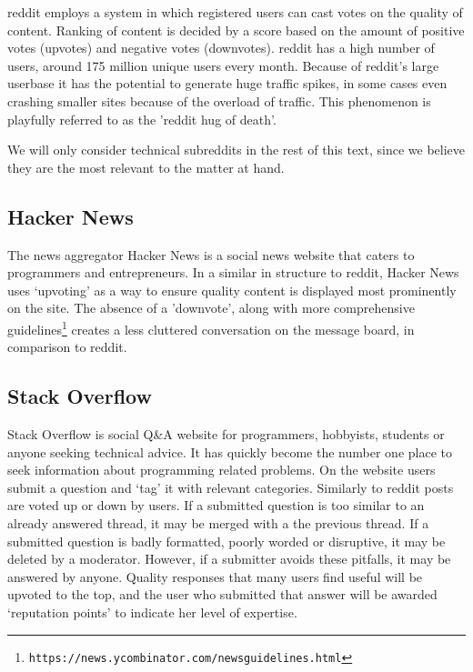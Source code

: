 \documentclass[a4paper,11pt]{article} %
\begin{document}
reddit employs a system in which registered users can cast votes on the
quality of content. Ranking of content is decided by a score based on the
amount of positive votes (upvotes) and negative votes (downvotes). reddit has
a high number of users, around 175 million unique users every month. Because
of reddit's large userbase it has the potential to generate huge traffic
spikes, in some cases even crashing smaller sites because of the overload of
traffic. This phenomenon is playfully referred to as the 'reddit hug of
death’.

We will only consider technical subreddits in the rest of this text,
since we believe they are the most relevant to the matter at hand.


\subsection{Hacker News}
The news aggregator Hacker News is a social news website that caters to
programmers and entrepreneurs. In a similar in structure to reddit, Hacker
News uses ‘upvoting’ as a way to ensure quality content is displayed most
prominently on the site. The absence of a 'downvote', along with more
comprehensive
guidelines\footnote{\texttt{https://news.ycombinator.com/newsguidelines.html}} 
creates a less cluttered conversation on the message board, in comparison
to reddit.


\subsection{Stack Overflow}

Stack Overflow is social Q\&A website for programmers, hobbyists, students or anyone
seeking technical advice. It has quickly become the number one
place to seek information about programming related problems. On the website
users submit a question and ‘tag' it with relevant categories.  Similarly
to reddit posts are voted up or down by users. If a submitted question is
too similar to an already answered thread, it may be merged with a the
previous thread. If a submitted question is badly formatted, poorly worded
or disruptive, it may be deleted by a moderator.  However, if a submitter
avoids these pitfalls, it may be answered by anyone. Quality responses that
many users find useful will be upvoted to the top, and the user who
submitted that answer will be awarded ‘reputation points’ to indicate her
level of expertise.
\end{document}

